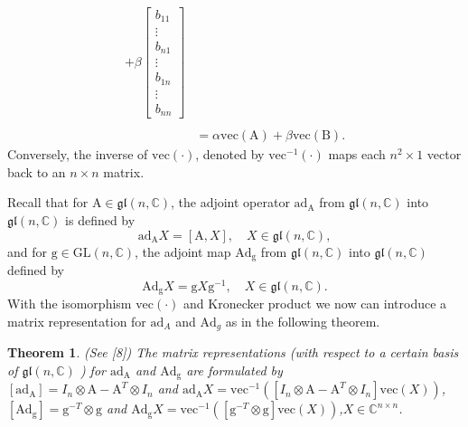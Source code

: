 \documentclass[11pt,a4paper]{article}
\newtheorem{theorem}{Theorem}
\begin{document}
\begin{align*}
	+ \beta 
\begin{bmatrix}
 		b_{11}  \\
 		\vdots \\
 		 b_{n1} \\
 	\hline	
 		\vdots \\
 	\hline	
 		 b_{1n} \\
 		 \vdots \\
 		 b_{nn}
	\end{bmatrix}
	\\
	\\		
&=
\alpha \mathrm{vec}(\mathrm{A}) + \beta \mathrm{vec}( \mathrm{B}).
\end{align*}
Conversely, the inverse of $\mathrm{vec}(\cdot)$, denoted by $\mathrm{vec}^{-1}(\cdot)$ maps each $n^2\times 1$ vector back to an $n \times n$ matrix.

Recall that for $\mathrm{A} \in \mathfrak{gl}(n,\mathbb{C})$, the adjoint operator $\mathrm{ad}_{\mathrm{A}}$ from $\mathfrak{gl}(n,\mathbb{C})$ into $\mathfrak{gl}(n,\mathbb{C})$ is defined by 
$$
\mathrm{ad}_{\mathrm{A}}X = [\mathrm{A},X], \quad X \in \mathfrak{gl}(n,\mathbb{C}),
$$
and for $\mathrm{g} \in \mathrm{GL}(n,\mathbb{C})$, the adjoint map $\mathrm{Ad}_{\mathrm{g}}$ from $\mathfrak{gl}(n,\mathbb{C})$ into $\mathfrak{gl}(n,\mathbb{C})$ defined by
$$
\mathrm{Ad}_{\mathrm{g}}X = \mathrm{g}X\mathrm{g}^{-1}, \quad X \in \mathfrak{gl}(n,\mathbb{C}).
$$
With the isomorphism $\mathrm{vec}(\cdot)$ and Kronecker product we now can introduce a matrix representation for
$\mathrm{ad}_{A}$ and $\mathrm{Ad}_{g}$
as in the following theorem.

\begin{theorem} (See [8]) The matrix representations (with respect to a certain basis of $\mathfrak{gl}(n,\mathbb{C})$ ) for $\mathrm{ad}_{\mathrm{A}}$ and $\mathrm{Ad}_{\mathrm{g}}$ are formulated by\\

\quad $[\mathrm{ad}_{\mathrm{A}}] = I_n \otimes \mathrm{A} - \mathrm{A}^T \otimes I_n $ \quad and \quad
$\mathrm{ad}_{\mathrm{A}} X = \mathrm{vec}^{-1}\left( [I_n \otimes \mathrm{A} - \mathrm{A}^T \otimes I_n ] \mathrm{vec}(X)\right)$,\\

\quad $[\mathrm{Ad}_{\mathrm{g}}] = \mathrm{g}^{-T} \otimes \mathrm{g} $ \quad and \quad
$\mathrm{Ad}_{\mathrm{g}}X = \mathrm{vec}^{-1}\left( [\mathrm{g}^{-T} \otimes \mathrm{g}]\mathrm{vec}(X) \right)$,\quad $X \in \mathbb{C}^{n\times n}$.\\
\end{theorem}
\end{document}
